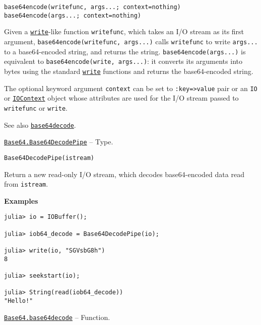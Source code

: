 \begin{adjustwidth}{2em}{0pt}


\begin{verbatim}
base64encode(writefunc, args...; context=nothing)
base64encode(args...; context=nothing)
\end{verbatim}

Given a \hyperlink{16947913578760238729}{\texttt{write}}-like function \texttt{writefunc}, which takes an I/O stream as its first argument, \texttt{base64encode(writefunc, args...)} calls \texttt{writefunc} to write \texttt{args...} to a base64-encoded string, and returns the string. \texttt{base64encode(args...)} is equivalent to \texttt{base64encode(write, args...)}: it converts its arguments into bytes using the standard \hyperlink{16947913578760238729}{\texttt{write}} functions and returns the base64-encoded string.

The optional keyword argument \texttt{context} can be set to \texttt{:key=>value} pair or an \texttt{IO} or \hyperlink{13454403377667762339}{\texttt{IOContext}} object whose attributes are used for the I/O stream passed to \texttt{writefunc} or \texttt{write}.

See also \hyperlink{7809304046524048078}{\texttt{base64decode}}.



\end{adjustwidth}
\hypertarget{3379294475433655298}{} 
\hyperlink{3379294475433655298}{\texttt{Base64.Base64DecodePipe}}  -- {Type.}

\begin{adjustwidth}{2em}{0pt}


\begin{verbatim}
Base64DecodePipe(istream)
\end{verbatim}

Return a new read-only I/O stream, which decodes base64-encoded data read from \texttt{istream}.

\textbf{Examples}


\begin{verbatim}
julia> io = IOBuffer();

julia> iob64_decode = Base64DecodePipe(io);

julia> write(io, "SGVsbG8h")
8

julia> seekstart(io);

julia> String(read(iob64_decode))
"Hello!"
\end{verbatim}



\end{adjustwidth}
\hypertarget{7809304046524048078}{} 
\hyperlink{7809304046524048078}{\texttt{Base64.base64decode}}  -- {Function.}

